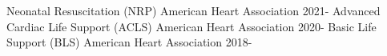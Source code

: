 


\begin{cvhonors}
   \cvhonor
    {Neonatal Resuscitation (NRP)}
    {American Heart Association}
    {}
    {2021-}
   \cvhonor
    {Advanced Cardiac Life Support (ACLS)}
    {American Heart Association}
    {}
    {2020-}
    \cvhonor
    {Basic Life Support (BLS)}
    {American Heart Association}
    {}
    {2018-} %
 
    
    

\end{cvhonors}
